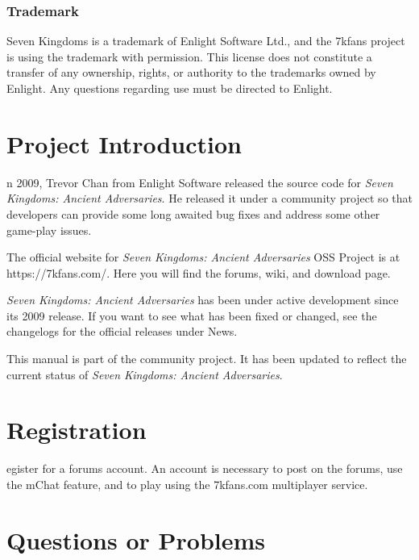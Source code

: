 \documentclass[openany]{book}
\begin{document}
\subsubsection{Trademark}

Seven Kingdoms is a trademark of Enlight Software Ltd., and the 7kfans project is using the trademark with permission. This license does not constitute a transfer of any ownership, rights, or authority to the trademarks owned by Enlight. Any questions regarding use must be directed to Enlight.

\clearpage

\section{Project Introduction}


n 2009, Trevor Chan from Enlight Software released the source code for \textit{Seven Kingdoms: Ancient Adversaries}. He released it under a community project so that developers can provide some long awaited bug fixes and address some other game-play issues. 

The official website for \textit{Seven Kingdoms: Ancient Adversaries} OSS Project is at https://7kfans.com/. Here you will find the forums, wiki, and download page.

\textit{Seven Kingdoms: Ancient Adversaries} has been under active development since its 2009 release. If you want to see what has been fixed or changed, see the changelogs for the official releases under News. 

This manual is part of the community project. It has been updated to reflect the current status of \textit{Seven Kingdoms: Ancient Adversaries}.

\section{Registration}


egister for a forums account. An account is necessary to post on the forums, use the mChat feature, and to play using the 7kfans.com multiplayer service.

\section{Questions or Problems}
\end{document}
